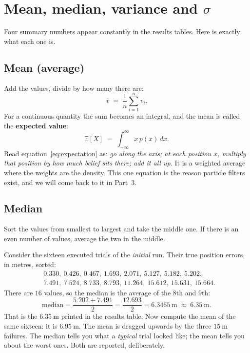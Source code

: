 \documentclass[11pt,a4paper]{report}
\newcommand{\term}[1]{\textcolor{rust}{\textbf{#1}}}
\begin{document}
\section{Mean, median, variance and $\sigma$}

Four summary numbers appear constantly in the results tables. Here is exactly
what each one is.

\subsection{Mean (average)}

Add the values, divide by how many there are:
\[
\bar{v} \;=\; \frac{1}{n}\sum_{i=1}^{n} v_i .
\]
For a continuous quantity the sum becomes an integral, and the mean is called
the \term{expected value}:
\begin{equation}
\mathbb{E}[X] \;=\; \int_{-\infty}^{\infty} x\, p(x)\, dx .
\label{eq:expectation}
\end{equation}
Read equation~\eqref{eq:expectation} as: \emph{go along the axis; at each
position $x$, multiply that position by how much belief sits there; add it all
up.} It is a weighted average where the weights are the density. This one
equation is the reason particle filters exist, and we will come back to it in
Part~3.

\subsection{Median}

Sort the values from smallest to largest and take the middle one. If there is
an even number of values, average the two in the middle.

\begin{handbox}
Consider the sixteen executed trials of the \emph{initial} run. Their true
position errors, in metres, sorted:
\[
\begin{aligned}
&0.330,\ 0.426,\ 0.467,\ 1.693,\ 2.071,\ 5.127,\ 5.182,\ \mathbf{5.202},\\
&\mathbf{7.491},\ 7.524,\ 8.733,\ 8.793,\ 11.264,\ 15.612,\ 15.631,\ 15.664 .
\end{aligned}
\]
There are $16$ values, so the median is the average of the $8$th and $9$th:
\[
\text{median} = \frac{5.202 + 7.491}{2} = \frac{12.693}{2} = \SI{6.3465}{\metre}
\;\approx\; \SI{6.35}{\metre}.
\]
That is the $\SI{6.35}{\metre}$ printed in the results table. Now compute the
mean of the same sixteen: it is $\SI{6.95}{\metre}$. The mean is dragged
upwards by the three $\SI{15}{\metre}$ failures. The median tells you what a
\emph{typical} trial looked like; the mean tells you about the worst ones. Both
are reported, deliberately.
\end{handbox}
\end{document}
